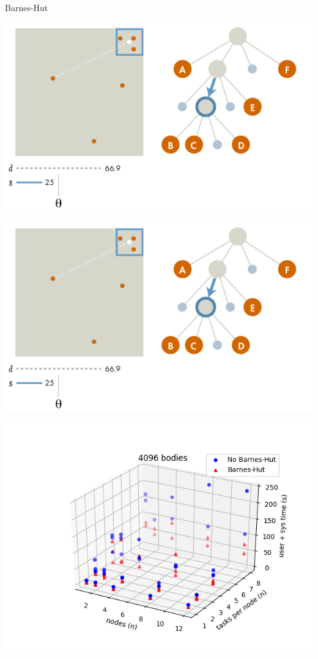 \documentclass{beamer}
\begin{document}
\begin{frame}[allowframebreaks]{Barnes-Hut}
\framebreak

\includegraphics[width=\textwidth]{quadtree_internal}

\framebreak

\includegraphics[width=\textwidth]{quadtree_internal}

\framebreak 

\includegraphics[width=\textwidth]{4096-nodes-tasksPerNode}


\end{frame}
\end{document}

